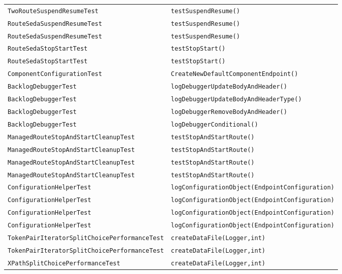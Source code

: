 \begin{center}
\begin{longtable}{ll}
\lstinline/TwoRouteSuspendResumeTest/&{\lstinline/testSuspendResume()/}\\
\lstinline/RouteSedaSuspendResumeTest/&{\lstinline/testSuspendResume()/}\\
\lstinline/RouteSedaSuspendResumeTest/&{\lstinline/testSuspendResume()/}\\
\lstinline/RouteSedaStopStartTest/&{\lstinline/testStopStart()/}\\
\lstinline/RouteSedaStopStartTest/&{\lstinline/testStopStart()/}\\
\lstinline/ComponentConfigurationTest/&{\lstinline/CreateNewDefaultComponentEndpoint()/}\\
\lstinline/BacklogDebuggerTest/&{\lstinline/logDebuggerUpdateBodyAndHeader()/}\\
\lstinline/BacklogDebuggerTest/&{\lstinline/logDebuggerUpdateBodyAndHeaderType()/}\\
\lstinline/BacklogDebuggerTest/&{\lstinline/logDebuggerRemoveBodyAndHeader()/}\\
\lstinline/BacklogDebuggerTest/&{\lstinline/logDebuggerConditional()/}\\
\lstinline/ManagedRouteStopAndStartCleanupTest/&{\lstinline/testStopAndStartRoute()/}\\
\lstinline/ManagedRouteStopAndStartCleanupTest/&{\lstinline/testStopAndStartRoute()/}\\
\lstinline/ManagedRouteStopAndStartCleanupTest/&{\lstinline/testStopAndStartRoute()/}\\
\lstinline/ManagedRouteStopAndStartCleanupTest/&{\lstinline/testStopAndStartRoute()/}\\
\lstinline/ConfigurationHelperTest/&{\lstinline/logConfigurationObject(EndpointConfiguration)/}\\
\lstinline/ConfigurationHelperTest/&{\lstinline/logConfigurationObject(EndpointConfiguration)/}\\
\lstinline/ConfigurationHelperTest/&{\lstinline/logConfigurationObject(EndpointConfiguration)/}\\
\lstinline/ConfigurationHelperTest/&{\lstinline/logConfigurationObject(EndpointConfiguration)/}\\
\lstinline/TokenPairIteratorSplitChoicePerformanceTest/&{\lstinline/createDataFile(Logger,int)/}\\
\lstinline/TokenPairIteratorSplitChoicePerformanceTest/&{\lstinline/createDataFile(Logger,int)/}\\
\lstinline/XPathSplitChoicePerformanceTest/&{\lstinline/createDataFile(Logger,int)/}\\

\end{longtable}
\end{center}
